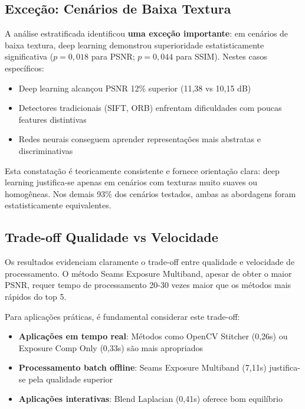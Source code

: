 \subsection{Exceção: Cenários de Baixa Textura}

A análise estratificada identificou \textbf{uma exceção importante}: em cenários de baixa textura, deep learning demonstrou superioridade estatisticamente significativa ($p=0{,}018$ para PSNR; $p=0{,}044$ para SSIM). Nestes casos específicos:

\begin{itemize}
    \item Deep learning alcançou PSNR 12\% superior (11,38 vs 10,15 dB)
    \item Detectores tradicionais (SIFT, ORB) enfrentam dificuldades com poucas features distintivas
    \item Redes neurais conseguem aprender representações mais abstratas e discriminativas
\end{itemize}

Esta constatação é teoricamente consistente e fornece orientação clara: deep learning justifica-se apenas em cenários com texturas muito suaves ou homogêneas. Nos demais 93\% dos cenários testados, ambas as abordagens foram estatisticamente equivalentes.

\subsection{Trade-off Qualidade vs Velocidade}

Os resultados evidenciam claramente o trade-off entre qualidade e velocidade de processamento. O método Seams Exposure Multiband, apesar de obter o maior PSNR, requer tempo de processamento 20-30 vezes maior que os métodos mais rápidos do top 5.

Para aplicações práticas, é fundamental considerar este trade-off:

\begin{itemize}
    \item \textbf{Aplicações em tempo real}: Métodos como OpenCV Stitcher (0,26s) ou Exposure Comp Only (0,33s) são mais apropriados
    \item \textbf{Processamento batch offline}: Seams Exposure Multiband (7,11s) justifica-se pela qualidade superior
    \item \textbf{Aplicações interativas}: Blend Laplacian (0,41s) oferece bom equilíbrio
\end{itemize}

